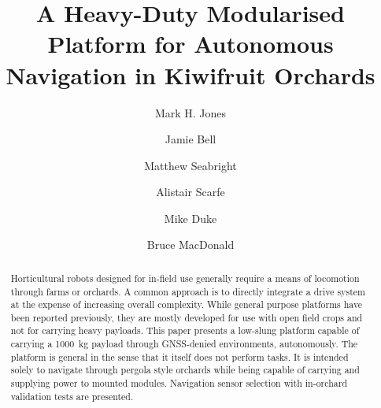 \documentclass[preprint,authoryear,12pt]{elsarticle}
\begin{document}
\begin{frontmatter}



\title{A Heavy-Duty Modularised Platform for Autonomous Navigation in Kiwifruit Orchards}



\author[UoW]{Mark H. Jones}

\author[UoA]{Jamie Bell}
\author[UoW]{Matthew Seabright}
\author[RPL]{Alistair Scarfe}
\author[UoW]{Mike Duke}
\author[UoA]{Bruce MacDonald}

\address[UoW]{School of Engineering, University of Waikato, Hamilton, New Zealand}
\address[UoA]{Faculty of Engineering, University of Auckland, Auckland, New Zealand}
\address[RPL]{Robotics Plus Ltd, Newnham Innovation Park, Tauranga, New Zealand}


\begin{abstract}
    Horticultural robots designed for in-field use generally require a means of locomotion through farms or orchards.
    A common approach is to directly integrate a drive system at the expense of increasing overall complexity.
    While general purpose platforms have been reported previously, they are mostly developed for use with open field crops and not for carrying heavy payloads.
    This paper presents a low-slung platform capable of carrying a \SI{1000}{\kilo\gram} payload through GNSS-denied environments, autonomously.
    The platform is general in the sense that it itself does not perform tasks.
    It is intended solely to navigate through pergola style orchards while being capable of carrying and supplying power to mounted modules.
    Navigation sensor selection with in-orchard validation tests are presented.





\end{abstract}
\end{frontmatter}
\end{document}
